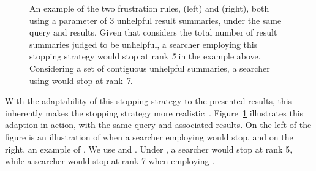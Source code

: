\begin{figure}[t!]
    \centering
    \caption[Examples of frustration rules  and ]{An example of the two frustration rules,  (left) and  (right), both using a parameter of 3 unhelpful result summaries, under the same query and results. Given that  considers the total number of result summaries judged to be unhelpful, a searcher employing this stopping strategy would stop at rank \emph{5} in the example above. Considering a set of contiguous unhelpful summaries, a searcher using  would stop at rank \emph{7.}}
    \label{fig:ss23}
\end{figure}

With the adaptability of this stopping strategy to the presented results, this inherently makes the stopping strategy more realistic~\citep{moffat2013users_versus_models}. Figure~\ref{fig:ss23} illustrates this adaption in action, with the same query and associated results. On the left of the figure is an illustration of when a searcher employing  would stop, and on the right, an example of . We use  and . Under , a searcher would stop at rank 5, while a searcher would stop at rank 7 when employing .

